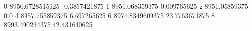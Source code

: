 0 8950.6728515625 -0.3857421875
1 8951.068359375 0.009765625
2 8951.05859375 0.0
4 8957.755859375 6.697265625
6 8974.8349609375 23.7763671875
8 8993.490234375 42.431640625
